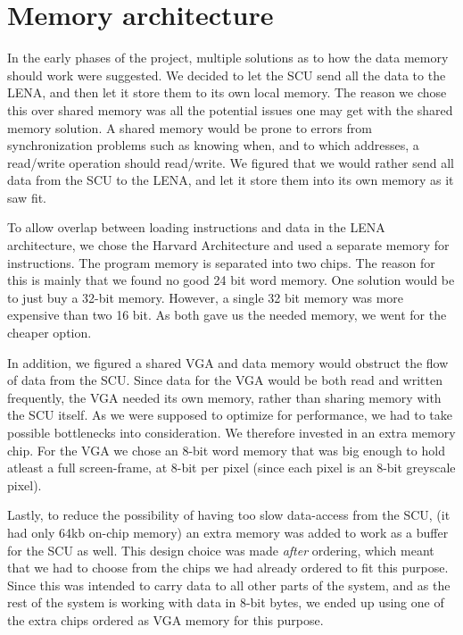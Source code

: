 \section {Memory architecture}
 In the early phases of the project,
multiple solutions as to how the data memory should work were suggested. We
decided to let the \ac{SCU} send all the data to the \ac{LENA}, and then let it store
them to its own local memory. The reason we chose this over shared memory was
all the potential issues one may get with the shared memory solution. A shared memory
would be prone to errors from synchronization problems such as knowing when,
and to which addresses, a read/write operation should read/write. We figured
that we would rather send all data from the \ac{SCU} to the \ac{LENA}, and let it
store them into its own memory as it saw fit.

To allow overlap between loading instructions and data in the LENA
architecture, we chose the Harvard Architecture and used a separate memory for
instructions. The program memory is
separated into two chips. The reason for this is mainly that we found no good 24
bit word memory. One solution would be to just buy a 32-bit memory. However, a single 32
bit memory was more expensive than two 16 bit. As both gave us the needed memory,
we went for the cheaper option.

In addition, we figured a shared \ac{VGA} and data memory would obstruct the flow
of data from the \ac{SCU}. Since data for the \ac{VGA} would be both read and written
frequently, the \ac{VGA} needed its own memory, rather than sharing memory with
the SCU itself. As we were supposed to optimize for performance, we had to take
possible bottlenecks into consideration. We therefore invested in an extra
memory chip. For the VGA we chose an 8-bit word memory that was big enough to
hold atleast a full screen-frame, at 8-bit per pixel (since each pixel is an 8-bit greyscale pixel).

Lastly, to reduce the possibility of having too slow data-access from the SCU, (it had only 64kb on-chip memory) 
an extra memory was added to work as a buffer for the SCU as well. This design choice was made {\em after} ordering, 
which meant that we had to choose from the chips we had already ordered to fit this purpose. Since this was intended 
to carry data to all other parts of the system, and as the rest of the system is working with data in 8-bit bytes, 
we ended up using one of the extra chips ordered as \ac{VGA} memory for this purpose.

